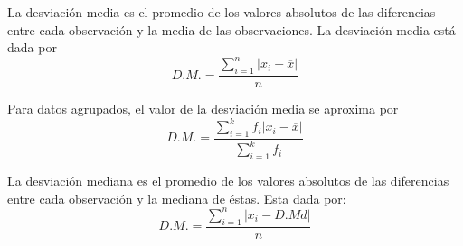 \begin{tcolorbox}[colframe=white]
    \begin{def.}
	La desviación media es el promedio de los valores absolutos de las diferencias entre cada observación y la media de las observaciones. La desviación media está dada por
	$$D.M. = \dfrac{\sum\limits_{i=1}^n|x_i-\overline{x}|}{n}$$
    \end{def.}
\end{tcolorbox}
Para datos agrupados, el valor de la desviación media se aproxima por 
\begin{equation}
    D.M. = \dfrac{\sum\limits_{i=1}^k f_i|x_i-\overline{x}|}{\sum\limits_{i=1}^k f_i}
\end{equation}

\begin{tcolorbox}[colframe=white]
    \begin{def.} La desviación mediana es el promedio de los valores absolutos de las diferencias entre cada observación y la mediana de éstas. Esta dada por:
	\begin{equation}
	    D.M. = \dfrac{\sum\limits_{i=1}^n|x_i-D.Md|}{n}
	\end{equation}
    \end{def.}
\end{tcolorbox}
